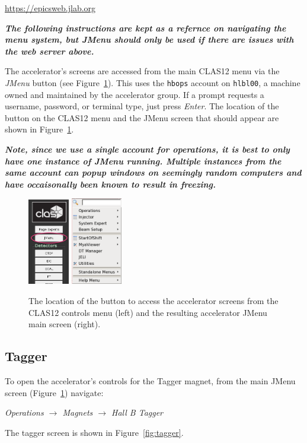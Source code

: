 \documentclass[amsmath,amssymb,notitlepage,11pt]{revtex4}
\begin{document}
\begin{center}\url{https://epicsweb.jlab.org}\end{center}

{\em\bf The following instructions are kept as a refernce on navigating the menu system, but JMenu should only be used if there are issues with the web server above.}

The accelerator's screens are accessed from the main CLAS12 menu via the {\em JMenu} button (see Figure~\ref{fig:jmenu}).  This uses the \texttt{hbops} account on \texttt{hlbl00}, a machine owned and maintained by the accelerator group.  If a prompt requests a username, password, or terminal type, just press {\em Enter}.  The location of the button on the CLAS12 menu and the JMenu screen that should appear are shown in Figure~\ref{fig:jmenu}.

{\bf\em Note, since we use a single account for operations, it is best to only have one instance of JMenu running.  Multiple instances from the same account can popup windows on seemingly random computers and have occaisonally been known to result in freezing.}
\begin{figure}[htbp]\centering
  \includegraphics[width=0.16\textwidth]{pics/clas12jmenu}
  \includegraphics[width=0.2\textwidth]{pics/jmenu}
  \caption{The location of the button to access the accelerator screens from the CLAS12 controls menu (left) and the resulting accelerator JMenu main screen (right).\label{fig:jmenu}}
\end{figure}
    \subsection{Tagger}
To open the accelerator's controls for the Tagger magnet, from the main JMenu screen (Figure~\ref{fig:jmenu}) navigate:
\begin{center}{\em Operations $\to$ Magnets $\to$ Hall B Tagger}\end{center}
The tagger screen is shown in Figure~\ref{fig:tagger}.
\end{document}
